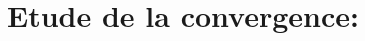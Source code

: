 \documentclass[a4paper,11pt]{article}   %
\begin{document}
\section{Etude de la convergence:}
%
%
%
%                       
% 
%    
%                  
%                  
%
\end{document}
